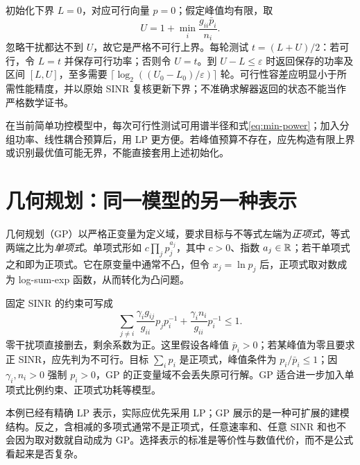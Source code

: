初始化下界 $L=0$，对应可行向量 $p=0$；假定峰值均有限，取
\begin{equation}
 U=1+\min_i\frac{g_{ii}\bar p_i}{n_i}.
\end{equation}
忽略干扰都达不到 $U$，故它是严格不可行上界。每轮测试 $t=(L+U)/2$：若可行，令 $L=t$ 并保存可行功率；否则令 $U=t$。到 $U-L\leq\varepsilon$ 时返回保存的功率及区间 $[L,U]$，至多需要
$\lceil\log_2((U_0-L_0)/\varepsilon)\rceil$ 轮。可行性容差应明显小于所需性能精度，并以原始 SINR 复核更新下界；不准确求解器返回的状态不能当作严格数学证书。

在当前简单功控模型中，每次可行性测试可用谱半径和式\eqref{eq:min-power}；加入分组功率、线性耦合预算后，用 LP 更方便。若峰值预算不存在，应先构造有限上界或识别最优值可能无界，不能直接套用上述初始化。

\section{几何规划：同一模型的另一种表示}
几何规划（GP）以严格正变量为定义域，要求目标与不等式左端为\emph{正项式}，等式两端之比为\emph{单项式}。单项式形如 $c\prod_jp_j^{a_j}$，其中 $c>0$、指数 $a_j\in\mathbb R$；若干单项式之和即为正项式。它在原变量中通常不凸，但令 $x_j=\ln p_j$ 后，正项式取对数成为 log-sum-exp 函数，从而转化为凸问题\cite{boyd2004}。

固定 SINR 的约束可写成
\begin{equation}
 \sum_{j\ne i}\frac{\gamma_i g_{ij}}{g_{ii}}p_jp_i^{-1}
 +\frac{\gamma_i n_i}{g_{ii}}p_i^{-1}\leq1.
 \label{eq:power-gp}
\end{equation}
零干扰项直接删去，剩余系数为正。这里假设各峰值 $\bar p_i>0$；若某峰值为零且要求正 SINR，应先判为不可行。目标 $\sum_i p_i$ 是正项式，峰值条件为 $p_i/\bar p_i\leq1$；因 $\gamma_i,n_i>0$ 强制 $p_i>0$，GP 的正变量域不会丢失原可行解。GP 适合进一步加入单项式比例约束、正项式功耗等模型。

本例已经有精确 LP 表示，实际应优先采用 LP；GP 展示的是一种可扩展的建模结构。反之，含相减的多项式通常不是正项式，任意速率和、任意 SINR 和也不会因为取对数就自动成为 GP。选择表示的标准是等价性与数值代价，而不是公式看起来是否复杂。
